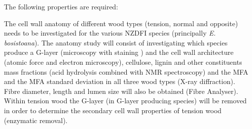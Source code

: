 The following properties are required:

The cell wall anatomy of different wood types (tension, normal and opposite)
needs to be investigated for the various NZDFI species (principally \textit{E.
bosistoana}). The anatomy study will consist of investigating which species
produce a G-layer (microscopy with staining \citep{Qiu_2008}) and the cell wall architecture
(atomic force and electron microscopy), cellulose, lignin and other constituents
mass fractions (acid hydrolysis combined with NMR spectroscopy) and the MFA and
the MFA standard deviation in all three wood types (X-ray diffraction). Fibre
diameter, length and lumen size will also be obtained (Fibre Analyser). Within
tension wood the G-layer (in G-layer producing species) will be
removed in order to determine the secondary cell wall properties of tension wood
(enzymatic removal).